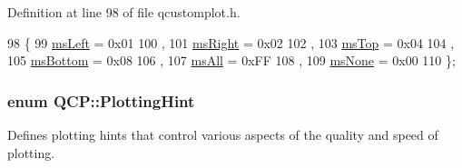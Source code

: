 Definition at line 98 of file qcustomplot.\+h.


\begin{DoxyCode}
98                 \{
99   \hyperlink{namespace_q_c_p_a7e487e3e2ccb62ab7771065bab7cae54a9500c8bfcc9e80b9dff0a8e00e867f07}{msLeft} = 0x01 
100   ,
101   \hyperlink{namespace_q_c_p_a7e487e3e2ccb62ab7771065bab7cae54a93c719593bb2b94ed244d52c86d83b65}{msRight} = 0x02 
102   ,
103   \hyperlink{namespace_q_c_p_a7e487e3e2ccb62ab7771065bab7cae54a5db8fb0d0b0ecf0d611c2602a348e8a0}{msTop} = 0x04 
104   ,
105   \hyperlink{namespace_q_c_p_a7e487e3e2ccb62ab7771065bab7cae54a5241d8eac2bab9524a38889f576179cc}{msBottom} = 0x08 
106   ,
107   \hyperlink{namespace_q_c_p_a7e487e3e2ccb62ab7771065bab7cae54a43d7361cb0c5244eabdc962021bffebc}{msAll} = 0xFF 
108   ,
109   \hyperlink{namespace_q_c_p_a7e487e3e2ccb62ab7771065bab7cae54a80aa4149f16dabd538f8b2e3d42c42d5}{msNone} = 0x00 
110 \};
\end{DoxyCode}
\hypertarget{namespace_q_c_p_a5400e5fcb9528d92002ddb938c1f4ef4}{}
\subsubsection[{Plotting\+Hint}]{\setlength{\rightskip}{0pt plus 5cm}enum {\bf Q\+C\+P\+::\+Plotting\+Hint}}\label{namespace_q_c_p_a5400e5fcb9528d92002ddb938c1f4ef4}
Defines plotting hints that control various aspects of the quality and speed of plotting.

